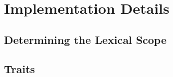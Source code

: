 
\chapter{Implementation Details}

\section{Determining the Lexical Scope}
\label{sec:app_lexical_scope}

\section{Traits}
\label{sec:app_traits}


